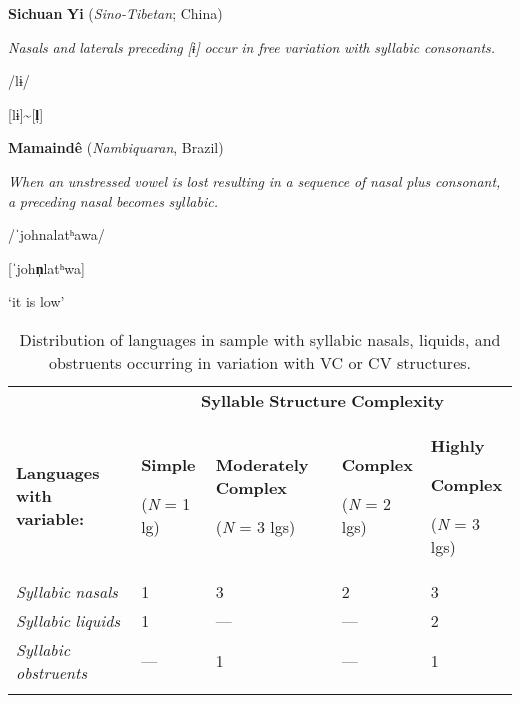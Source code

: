 \ea\label{ex:(3.17)}
   \textbf{Sichuan} \textbf{Yi} (\textit{Sino-Tibetan}; China)



\textit{Nasals} \textit{and} \textit{laterals} \textit{preceding} \textit{[ɨ]} \textit{occur} \textit{in} \textit{free} \textit{variation} \textit{with} \textit{syllabic} \textit{consonants.}



/lɨ/



[lɨ]{\textasciitilde}[\textbf{l̩}]



\citep[31]{Gerner2013}

\z


\ea\label{ex:(3.18)}
   \textbf{Mamaindê} (\textit{Nambiquaran}, Brazil)



\textit{When} \textit{an} \textit{unstressed} \textit{vowel} \textit{is} \textit{lost} \textit{resulting} \textit{in} \textit{a} \textit{sequence} \textit{of} \textit{nasal} \textit{plus} \textit{consonant,} \textit{a} \textit{preceding} \textit{nasal} \textit{becomes} \textit{syllabic.}



/ˈjohnalatʰawa/



[ˈjoh\textbf{n̩}latʰwa]



‘it is low’



\citep[262-3]{Eberhard2009}

\z





\begin{table}
\begin{tabularx}{\textwidth}{XXXXX}
 & \multicolumn{4}{c}{ \textbf{Syllable} \textbf{Structure} \textbf{Complexity}}\\
\lsptoprule
 \textbf{Languages} \textbf{with} \textbf{variable:} & { \textbf{Simple}}

 (\textit{N} = 1 lg) & { \textbf{Moderately} \textbf{Complex}}

 (\textit{N} = 3 lgs) & { \textbf{Complex}}

 (\textit{N} = 2 lgs) & { \textbf{Highly} }

{ \textbf{Complex}}

 (\textit{N} = 3 lgs)\\
 \textit{Syllabic} \textit{nasals} & 1 & 3 & 2 & 3\\
 \textit{Syllabic} \textit{liquids} & 1 & — & — & 2\\
 \textit{Syllabic} \textit{obstruents} & — & 1 & — & 1\\
\lspbottomrule
\end{tabularx}
\caption{\label{3.7}Distribution of languages in sample with syllabic nasals, liquids, and obstruents occurring in variation with VC or CV structures.}
\end{table}




